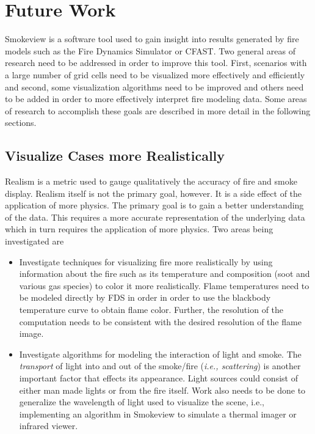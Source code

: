 \documentclass[11pt,twoside]{book}
\begin{document}
\chapter{Future Work}

Smokeview is a software tool used to gain insight into results
generated by fire models such as the Fire Dynamics Simulator or
CFAST. Two general areas of research need to be addressed in order
to improve this tool. First, scenarios with a large number of grid
cells need to be visualized more effectively and efficiently and
second, some visualization algorithms need to be improved and
others need to be added in order to more effectively interpret
fire modeling data. Some areas of research to accomplish these
goals are described in more detail in the following sections.

%
%

\section{Visualize Cases more Realistically}
Realism is a metric used to gauge qualitatively the accuracy of
fire and smoke display. Realism itself is not the primary goal,
however.  It is a side effect of the application of more physics.
The primary goal is to gain a better understanding of the data.
This requires a more accurate representation of the underlying
data which in turn requires the application of more physics.  Two
areas being investigated are
\begin{itemize}
\item Investigate techniques for visualizing fire more
realistically by using information about the fire such as its
temperature and composition (soot and various gas species) to
color it more realistically.  Flame temperatures need to be
modeled directly by FDS in order in order to use the blackbody
temperature curve to obtain flame color.  Further, the resolution
of the computation needs to be consistent with the desired
resolution of the flame image.

\item Investigate algorithms for modeling the interaction of light
and smoke. The {\em transport} of light into and out of the
smoke/fire ({\em i.e., scattering}) is another important factor
that effects its appearance.  Light sources could consist of
either man made lights or from the fire itself.  Work also needs
to be done to generalize the wavelength of light used to visualize
the scene, i.e., implementing an algorithm in Smokeview to
simulate a thermal imager or infrared viewer.
\end{itemize}
\end{document}
